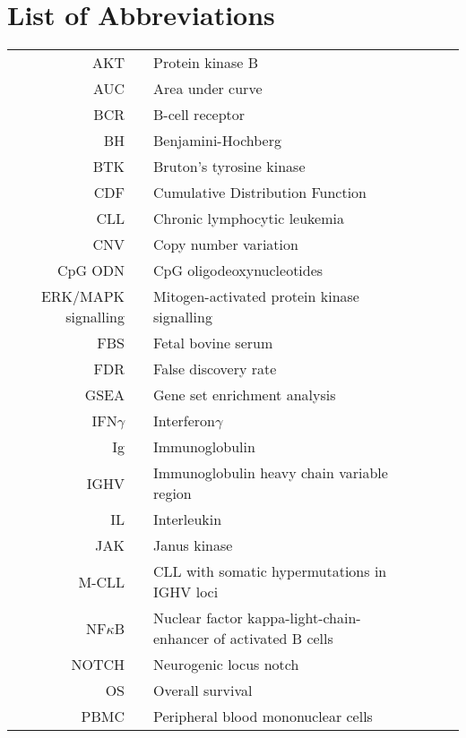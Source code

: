 \documentclass[11pt, a4paper, twosided]{book}
\begin{document}
\newpage
\tableofcontents
\clearpage

\newpage
\hypertarget{list-of-abbreviations}{%
\chapter*{List of Abbreviations}\label{list-of-abbreviations}}
\begin{tabular}{rp{0.2cm}lp{1cm}rp{0.2cm}l}
    AKT & & Protein kinase B \\
    AUC & & Area under curve \\
    BCR & & B-cell receptor \\
    BH & & Benjamini-Hochberg \\
    BTK & & Bruton’s tyrosine kinase \\
    CDF & & Cumulative Distribution Function \\
    CLL & & Chronic lymphocytic leukemia \\
    CNV & & Copy number variation \\
    CpG ODN & & CpG oligodeoxynucleotides \\
    ERK/MAPK signalling & & Mitogen-activated protein kinase signalling \\
    FBS & & Fetal bovine serum \\
    FDR & & False discovery rate \\
    GSEA & & Gene set enrichment analysis  \\
    IFN$\gamma$ & & Interferon$\gamma$   \\ 
    Ig & & Immunoglobulin \\
    IGHV & & Immunoglobulin heavy chain variable region \\
    IL & & Interleukin \\
    JAK & & Janus kinase \\
    M-CLL & & CLL with somatic hypermutations in IGHV loci \\
    NF$\kappa$B & & Nuclear factor kappa-light-chain-enhancer of activated B cells \\
    NOTCH & & Neurogenic locus notch  \\
    OS & & Overall survival \\
    PBMC & & Peripheral blood mononuclear cells \\

\end{tabular}
\end{document}
